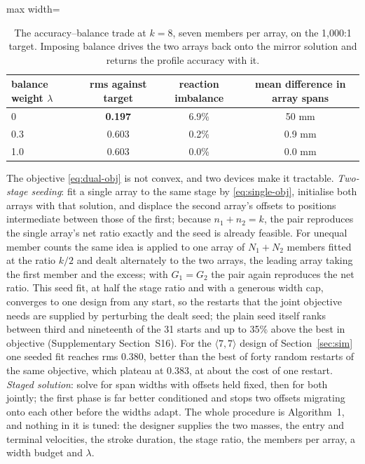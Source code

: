 \documentclass[preprint,12pt,number]{elsarticle}
\newcommand{\cfg}[2]{\langle #1,#2\rangle}
\begin{document}
\begin{table}[H]
\centering
\caption{The accuracy--balance trade at $k=8$, seven members per array, on the 1,000:1 target. Imposing balance drives the two arrays back onto the mirror solution and returns the profile accuracy with it.}
\label{tab:lambda}
\begin{adjustbox}{max width=\linewidth}
\begin{tabular}{lccc}
\toprule
balance weight $\lambda$ & rms against target & reaction imbalance & mean difference in array spans \\
\midrule
0   & \textbf{0.197} & 6.9\% & 50 mm \\
0.3 & 0.603 & 0.2\% & 0.9 mm \\
1.0 & 0.603 & 0.0\% & 0.0 mm \\
\bottomrule
\end{tabular}
\end{adjustbox}
\end{table}

The objective \eqref{eq:dual-obj} is not convex, and two devices make it tractable. \emph{Two-stage seeding}: fit a single array to the same stage by \eqref{eq:single-obj}, initialise both arrays with that solution, and displace the second array's offsets to positions intermediate between those of the first; because $n_1 + n_2 = k$, the pair reproduces the single array's net ratio exactly and the seed is already feasible. For unequal member counts the same idea is applied to one array of $N_1 + N_2$ members fitted at the ratio $k/2$ and dealt alternately to the two arrays, the leading array taking the first member and the excess; with $G_1 = G_2$ the pair again reproduces the net ratio. This seed fit, at half the stage ratio and with a generous width cap, converges to one design from any start, so the restarts that the joint objective needs are supplied by perturbing the dealt seed; the plain seed itself ranks between third and nineteenth of the 31 starts and up to 35\% above the best in objective (Supplementary Section~S16). For the $\cfg{7}{7}$ design of Section~\ref{sec:sim} one seeded fit reaches rms 0.380, better than the best of forty random restarts of the same objective, which plateau at 0.383, at about the cost of one restart. \emph{Staged solution}: solve for span widths with offsets held fixed, then for both jointly; the first phase is far better conditioned and stops two offsets migrating onto each other before the widths adapt. The whole procedure is Algorithm~1, and nothing in it is tuned: the designer supplies the two masses, the entry and terminal velocities, the stroke duration, the stage ratio, the members per array, a width budget and $\lambda$.
\end{document}
